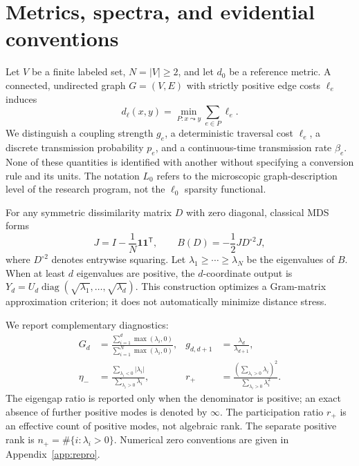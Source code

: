 \documentclass[11pt,letterpaper]{article}
\theoremstyle{definition}
\theoremstyle{remark}
\newcommand{\one}{\mathbf 1}
\newcommand{\diag}{\operatorname{diag}}
\begin{document}
\section{Metrics, spectra, and evidential conventions}\label{sec:notation}
Let $V$ be a finite labeled set, $N=|V|\geq2$, and let $d_0$ be a reference metric. A connected, undirected graph $G=(V,E)$ with strictly positive edge costs $\ell_e$ induces
\begin{equation}
 d_\ell(x,y)=\min_{P:x\leadsto y}\sum_{e\in P}\ell_e.
 \label{eq:shortest}
\end{equation}
We distinguish a coupling strength $g_e$, a deterministic traversal cost $\ell_e$, a discrete transmission probability $p_e$, and a continuous-time transmission rate $\beta_e$. None of these quantities is identified with another without specifying a conversion rule and its units. The notation $L_0$ refers to the microscopic graph-description level of the research program, not the $\ell_0$ sparsity functional.

For any symmetric dissimilarity matrix $D$ with zero diagonal, classical MDS forms
\begin{equation}
 J=I-\frac1N\one\one^{\mathsf T},\qquad
 B(D)=-\frac12 JD^{\circ2}J,
 \label{eq:gram}
\end{equation}
where $D^{\circ2}$ denotes entrywise squaring. Let $\lambda_1\geq\cdots\geq\lambda_N$ be the eigenvalues of $B$. When at least $d$ eigenvalues are positive, the $d$-coordinate output is $Y_d=U_d\diag(\sqrt{\lambda_1},\ldots,\sqrt{\lambda_d})$. This construction optimizes a Gram-matrix approximation criterion; it does not automatically minimize distance stress.

We report complementary diagnostics:
\begin{align}
 G_d&=\frac{\sum_{i=1}^d\max(\lambda_i,0)}{\sum_{i=1}^N\max(\lambda_i,0)}, &
 g_{d,d+1}&=\frac{\lambda_d}{\lambda_{d+1}},\label{eq:diagnostics1}\\
 \eta_-&=\frac{\sum_{\lambda_i<0}|\lambda_i|}{\sum_{\lambda_i>0}\lambda_i}, &
 r_+&=\frac{(\sum_{\lambda_i>0}\lambda_i)^2}{\sum_{\lambda_i>0}\lambda_i^2}.
 \label{eq:diagnostics2}
\end{align}
The eigengap ratio is reported only when the denominator is positive; an exact absence of further positive modes is denoted by $\infty$. The participation ratio $r_+$ is an effective count of positive modes, not algebraic rank. The separate positive rank is $n_+=\#\{i:\lambda_i>0\}$. Numerical zero conventions are given in Appendix~\ref{app:repro}.
\end{document}
